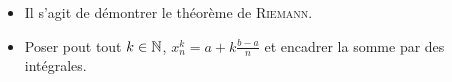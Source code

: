 \begin{itemize}
    \item Il s'agit de démontrer le théorème de \textsc{Riemann}. 
    \item Poser pout tout $k \in \mathbb{N}$, $x_n^k=a+k\frac{b-a}{n}$ et encadrer la somme par des intégrales. 
\end{itemize}